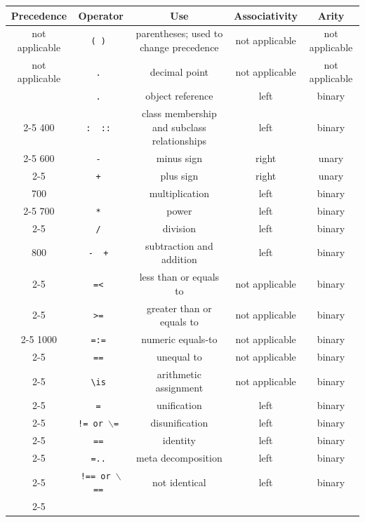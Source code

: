 \documentclass[11pt]{article}
\newcommand{\bs}{\textbackslash}
\newcommand{\bksl}{\symbol{92}}
\begin{document}
\begin{table}[htb]
  \center
{ \footnotesize
\begin{tabular}{|c|c|c|c|c|}
\hline
Precedence  & Operator & Use & Associativity & Arity \\ \hline
not applicable & \tt(~) & parentheses; used to change precedence & not applicable & not applicable\\ \hline
not applicable &\tt . & decimal point & not applicable & not applicable \\ \hline
            &\tt .   & object reference & left & binary \\ \cline{2-5}
400         & \tt :~ ::    & class membership and subclass relationships & left & binary \\ \cline{2-5}
600         & \tt - & minus sign & right & unary \\ \cline{2-5}
            & \tt + & plus sign & right & unary \\ \hline
700         & \tt * & multiplication & left & binary \\ \cline{2-5}
700         & \tt ** & power & left & binary \\ \cline{2-5}
            & \tt / & division & left & binary \\ \hline
800         & \tt- ~+ & subtraction and addition & left & binary \\ \cline{2-5}
            &\tt =< & less than or equals to & not applicable & binary \\ \cline{2-5}
            &\tt >= & greater than or equals to & not applicable & binary \\ \cline{2-5}
1000        &\tt =:= & numeric equals-to & not applicable & binary \\ \cline{2-5}
            &\tt ={\bksl}= & unequal to & not applicable & binary \\ \cline{2-5}
            &\tt \bs{}is & arithmetic assignment & not applicable & binary \\ \cline{2-5}
            &\tt = & unification & left & binary \\ \cline{2-5}
            &\tt != or $\backslash$= & disunification & left & binary \\ \cline{2-5}
            &\tt == & identity & left & binary \\ \cline{2-5}
            &\tt =.. & meta decomposition & left & binary \\  \cline{2-5}
            &\tt !== or \texttt{$\backslash$==} & not identical & left & binary \\ \cline{2-5}

\end{tabular}}
\end{table}
\end{document}
